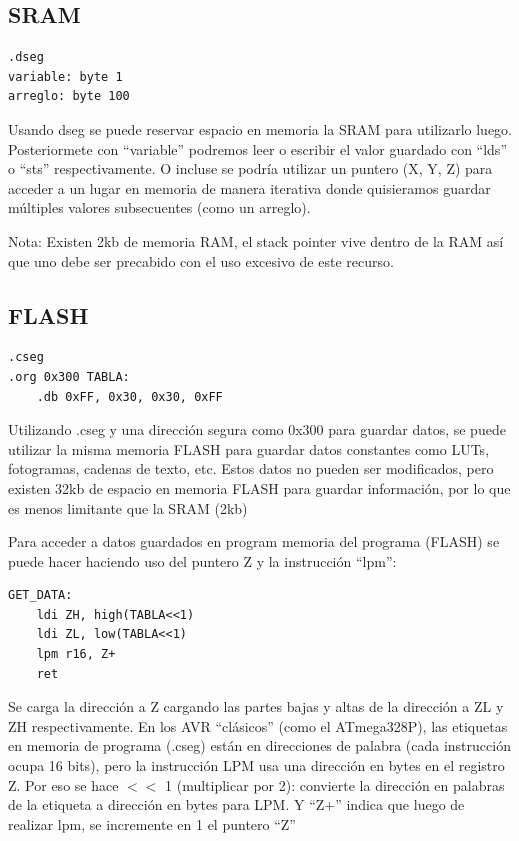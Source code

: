 \subsection{SRAM}

\begin{verbatim}
.dseg
variable: byte 1  
arreglo: byte 100
\end{verbatim}

Usando dseg se puede reservar espacio en memoria la SRAM para utilizarlo luego. Posteriormete con ``variable'' podremos leer o escribir el valor guardado con ``lds'' o ``sts'' respectivamente. O incluse se podría utilizar un puntero (X, Y, Z) para acceder a un lugar en memoria de manera iterativa donde quisieramos guardar múltiples valores subsecuentes (como un arreglo). 

Nota: Existen 2kb de memoria RAM, el stack pointer vive dentro de la RAM así que uno debe ser precabido con el uso excesivo de este recurso.

\subsection{FLASH}

\begin{verbatim}
.cseg
.org 0x300 TABLA:
    .db 0xFF, 0x30, 0x30, 0xFF
\end{verbatim}

Utilizando .cseg y una dirección segura como 0x300 para guardar datos, se puede utilizar la misma memoria FLASH para guardar datos constantes como LUTs, fotogramas, cadenas de texto, etc. Estos datos no pueden ser modificados, pero existen 32kb de espacio en memoria FLASH para guardar información, por lo que es menos limitante que la SRAM (2kb)

Para acceder a datos guardados en program memoria del programa (FLASH) se puede hacer haciendo uso del puntero Z y la instrucción ``lpm'':

\begin{verbatim}
GET_DATA:
    ldi ZH, high(TABLA<<1)
    ldi ZL, low(TABLA<<1)
    lpm r16, Z+
    ret
\end{verbatim}

Se carga la dirección a Z cargando las partes bajas y altas de la dirección a ZL y ZH respectivamente. En los AVR  ``clásicos'' (como el ATmega328P), las etiquetas en memoria de programa (.cseg) están en direcciones de palabra (cada instrucción ocupa 16 bits), pero la instrucción LPM usa una dirección en bytes en el registro Z. Por eso se hace $<$$<$ 1 (multiplicar por 2): convierte la dirección en palabras de la etiqueta a dirección en bytes para LPM. Y ``Z+'' indica que luego de realizar lpm, se incremente en 1 el puntero ``Z''

